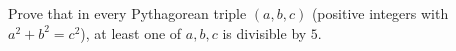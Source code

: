 Prove that in every Pythagorean triple $(a,b,c)$ (positive integers with $a^2+b^2=c^2$), at least one of $a,b,c$ is divisible by $5$.
